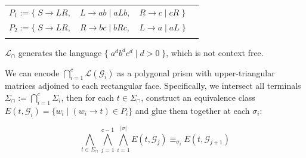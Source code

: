 \documentclass[portrait,a0b,final,a4resizeable]{a0poster}
\begin{document}
\begin{poster}
\begin{multicols}{2}
{\begin{minipage}[c]{0.90\columnwidth}
       \begin{center}
        \begin{tabular}{llll}
          $P_1 := \big\{\;S \rightarrow L R,$ & $L \rightarrow a b \mid a L b,$ & $R \rightarrow c \mid c R\;\big\}$\vspace{5pt}\\
          $P_2 := \big\{\;S \rightarrow L R,$ & $R \rightarrow b c \mid b R c,$ & $L \rightarrow a \mid a L\;\big\}$\\\\
        \end{tabular}
        \end{center}

         $\mathcal{L}_\cap$ generates the language $\big\{\;a^d b^d c^d \mid d > 0\;\big\}$, which is not context free.

       We can encode $\bigcap_{i=1}^c \mathcal{L}(\mathcal{G}_i)$ as a polygonal prism with upper-triangular matrices adjoined to each rectangular face. Specifically, we intersect all terminals $\Sigma_\cap := \bigcap_{i=1}^c \Sigma_i$, then for each $t \in \Sigma_\cap$, construct an equivalence class $E(t, \mathcal{G}_i) = \{ w_i \mid (w_i \rightarrow t) \in P_i\}$ and glue them together at each $\sigma_i$:

       \[
         \bigwedge_{t\in\Sigma_\cap}\bigwedge_{j = 1}^{c-1}\bigwedge_{i=1}^{|\sigma|} E(t, \mathcal{G}_j) \equiv_{\sigma_i} E(t, \mathcal{G}_{j+1})
         \]


\end{minipage}}
\end{multicols}
\end{poster}
\end{document}
